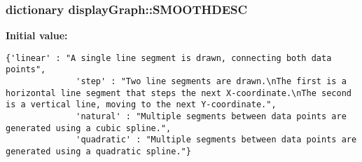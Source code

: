 \hypertarget{namespacedisplayGraph_677eaaea795085997b6f4651dff9c20c}{
\subsubsection{\setlength{\rightskip}{0pt plus 5cm}dictionary {\bf displayGraph::SMOOTHDESC}}}
\label{namespacedisplayGraph_677eaaea795085997b6f4651dff9c20c}


\textbf{Initial value:}

\begin{Code}\begin{verbatim}{'linear' : "A single line segment is drawn, connecting both data points",
              'step' : "Two line segments are drawn.\nThe first is a horizontal line segment that steps the next X-coordinate.\nThe second is a vertical line, moving to the next Y-coordinate.",
              'natural' : "Multiple segments between data points are generated using a cubic spline.",
              'quadratic' : "Multiple segments between data points are generated using a quadratic spline."}
\end{verbatim}
\end{Code}
